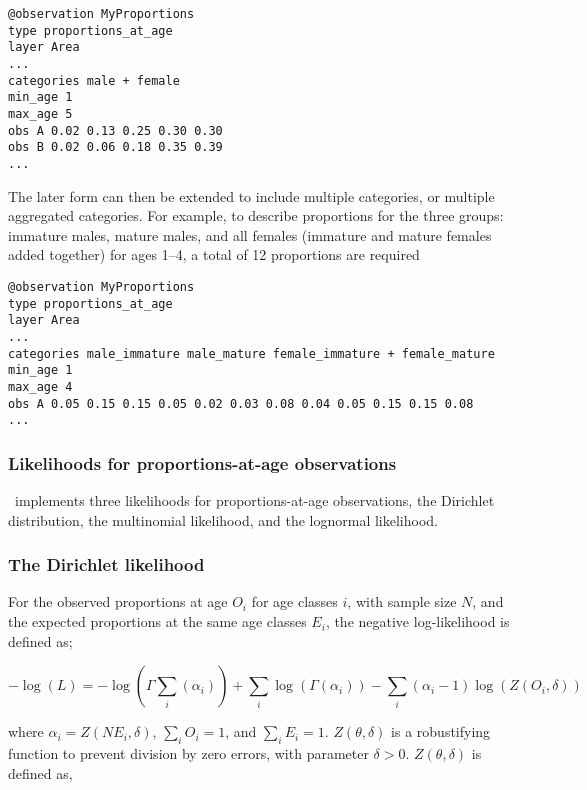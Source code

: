 {{{{{\small{\begin{verbatim}
@observation MyProportions
type proportions_at_age
layer Area
...
categories male + female
min_age 1
max_age 5
obs A 0.02 0.13 0.25 0.30 0.30
obs B 0.02 0.06 0.18 0.35 0.39
...
\end{verbatim}

The later form can then be extended to include multiple categories, or multiple aggregated categories. For example, to describe proportions for the three groups: immature males, mature males, and all females (immature and mature females added together) for ages 1--4, a total of 12 proportions are required 

{\small{\begin{verbatim}
@observation MyProportions
type proportions_at_age
layer Area
...
categories male_immature male_mature female_immature + female_mature
min_age 1
max_age 4
obs A 0.05 0.15 0.15 0.05 0.02 0.03 0.08 0.04 0.05 0.15 0.15 0.08
...
\end{verbatim}}}

\subsubsection{Likelihoods for proportions-at-age observations}

\SPM\ implements three likelihoods for proportions-at-age observations, the Dirichlet distribution, the multinomial likelihood, and the lognormal likelihood. 

\subsubsection*{The Dirichlet likelihood}

For the observed proportions at age $O_i$ for age classes $i$, with sample size $N$, and the expected proportions at the same age classes $E_i$, the negative log-likelihood is defined as; 

\begin{equation}
  -\log \left(L \right) = -\log(\Gamma \sum\limits_i (\alpha_i)) + \sum\limits_i \log(\Gamma (\alpha_i)) - \sum\limits_i (\alpha_i-1) \log(Z(O_i,\delta))
\end{equation}

where $\alpha_i = Z \left(N E_i,\delta \right)$, $\sum\limits_i O_i = 1$, and $\sum\limits_i E_i = 1$. $Z \left(\theta,\delta \right)$ is a robustifying function to prevent division by zero errors, with parameter $\delta>0$. $Z \left(\theta,\delta \right)$ is defined as,

}}}}}}
